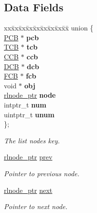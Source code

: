 \subsection*{Data Fields}
\begin{DoxyCompactItemize}
\item 
\begin{tabbing}
xx\=xx\=xx\=xx\=xx\=xx\=xx\=xx\=xx\=\kill
union \{\\
\>\hyperlink{group__proc_gadf327f09ee935cf1734c14e8849f0421}{PCB} $\ast$ {\bfseries pcb}\\
\>\hyperlink{group__scheduler_gaf88d9c946bf70b36a1e8bc34383abfc9}{TCB} $\ast$ {\bfseries tcb}\\
\>\hyperlink{group__scheduler_ga7485b31e0dd9fd723bc2d75fba5206a0}{CCB} $\ast$ {\bfseries ccb}\\
\>\hyperlink{group__dev_gaf0e2d4a982667466d84f6fb7522611d6}{DCB} $\ast$ {\bfseries dcb}\\
\>\hyperlink{group__streams_ga0c7e751afb9d6cadebf070961804d400}{FCB} $\ast$ {\bfseries fcb}\\
\>void $\ast$ {\bfseries obj}\\
\>\hyperlink{group__rlists_gaae2ea9be18d20f0c80a62a2f8e2eed4d}{rlnode\_ptr} {\bfseries node}\\
\>intptr\_t {\bfseries num}\\
\>uintptr\_t {\bfseries unum}\\
\}; \\

\end{tabbing}\begin{DoxyCompactList}\small\item\em The list node\textquotesingle{}s key. \end{DoxyCompactList}\item 
\hyperlink{group__rlists_gaae2ea9be18d20f0c80a62a2f8e2eed4d}{rlnode\+\_\+ptr} \hyperlink{structresource__list__node_a280b77fdcee186bcaade02f76322d183}{prev}\hypertarget{structresource__list__node_a280b77fdcee186bcaade02f76322d183}{}\label{structresource__list__node_a280b77fdcee186bcaade02f76322d183}

\begin{DoxyCompactList}\small\item\em Pointer to previous node. \end{DoxyCompactList}\item 
\hyperlink{group__rlists_gaae2ea9be18d20f0c80a62a2f8e2eed4d}{rlnode\+\_\+ptr} \hyperlink{structresource__list__node_a04b1ee9524cd800f14de2925141e3762}{next}\hypertarget{structresource__list__node_a04b1ee9524cd800f14de2925141e3762}{}\label{structresource__list__node_a04b1ee9524cd800f14de2925141e3762}

\begin{DoxyCompactList}\small\item\em Pointer to next node. \end{DoxyCompactList}\end{DoxyCompactItemize}


